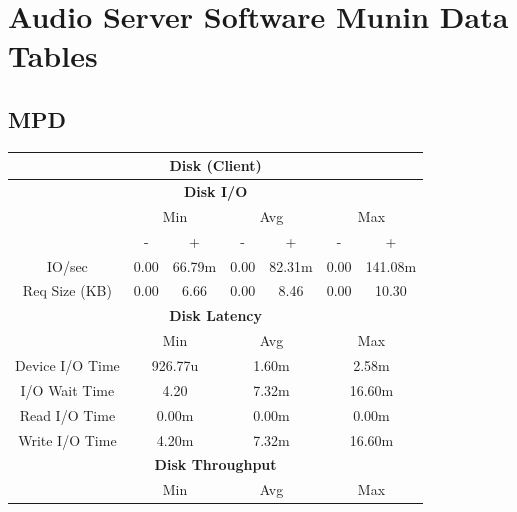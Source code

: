 \documentclass[11pt,a4paper,headinclude=false,footinclude=false]{scrreprt}
\begin{document}
\section{\texorpdfstring{Audio Server Software Munin Data Tables
\label{AppendicesAudioServerSoftwareTables}}{Audio Server Software Munin Data Tables }}\label{audio-server-software-munin-data-tables}

\subsection{MPD}\label{mpd-3}

\begin{table}[H]
\centering
    \begin{tabular}{||c|c|c|c|c|c|c||}
    \hline
    \multicolumn{7}{|c|}{\textbf{Disk (Client)}} \\
    \hline
    \multicolumn{7}{|c|}{\textbf{Disk I/O}} \\
    \hline\hline
      & \multicolumn{2}{|c|}{Min} & \multicolumn{2}{|c|}{Avg} & \multicolumn{2}{|c|}{Max} \\
    \hline
      & - & + & - & + & - & + \\
    \hline
    IO/sec & 0.00 & 66.79m & 0.00 & 82.31m & 0.00 & 141.08m \\
    \hline
    Req Size (KB) & 0.00 & 6.66 & 0.00 & 8.46 & 0.00 & 10.30 \\
    \hline\hline
    \multicolumn{7}{|c|}{\textbf{Disk Latency}} \\
    \hline\hline
      & \multicolumn{2}{|c|}{Min} & \multicolumn{2}{|c|}{Avg} & \multicolumn{2}{|c|}{Max} \\
    \hline
    Device I/O Time  & \multicolumn{2}{|c|}{926.77u} & \multicolumn{2}{|c|}{1.60m} & \multicolumn{2}{|c|}{2.58m} \\
    \hline
    I/O Wait Time  & \multicolumn{2}{|c|}{4.20} & \multicolumn{2}{|c|}{7.32m} & \multicolumn{2}{|c|}{16.60m} \\
    \hline
    Read I/O Time  & \multicolumn{2}{|c|}{0.00m} & \multicolumn{2}{|c|}{0.00m} & \multicolumn{2}{|c|}{0.00m} \\
    \hline
    Write I/O Time  & \multicolumn{2}{|c|}{4.20m} & \multicolumn{2}{|c|}{7.32m} & \multicolumn{2}{|c|}{16.60m} \\
    \hline\hline
    \multicolumn{7}{|c|}{\textbf{Disk Throughput}} \\
    \hline\hline
      & \multicolumn{2}{|c|}{Min} & \multicolumn{2}{|c|}{Avg} & \multicolumn{2}{|c|}{Max} \\

\end{tabular}
\end{table}
\end{document}
